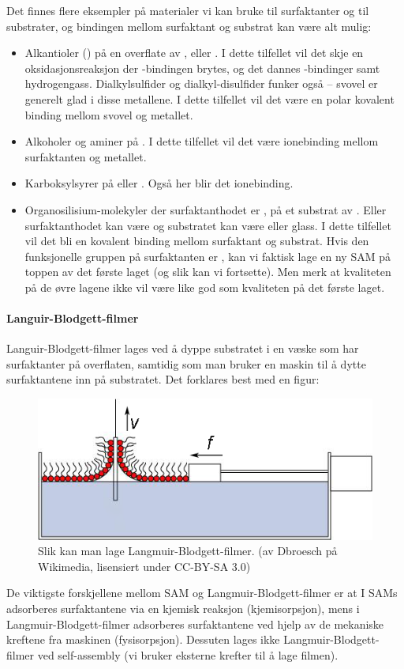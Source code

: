Det finnes flere eksempler på materialer vi kan bruke til surfaktanter og til substrater, og bindingen mellom surfaktant og substrat kan være alt mulig:
\begin{itemize}
	\item Alkantioler () på en overflate av ,  eller . I dette tilfellet vil det skje en oksidasjonsreaksjon der -bindingen brytes, og det dannes -bindinger samt hydrogengass. Dialkylsulfider og dialkyl-disulfider funker også -- svovel er generelt glad i disse metallene. I dette tilfellet vil det være en polar kovalent binding mellom svovel og metallet.
	\item Alkoholer og aminer på . I dette tilfellet vil det være ionebinding mellom surfaktanten og metallet.
	\item Karboksylsyrer på  eller . Også her blir det ionebinding.
	\item Organosilisium-molekyler der surfaktanthodet er , på et substrat av . Eller surfaktanthodet kan være  og substratet kan være  eller glass. I dette tilfellet vil det bli en kovalent binding mellom surfaktant og substrat. Hvis den funksjonelle gruppen på surfaktanten er , kan vi faktisk lage en ny SAM på toppen av det første laget (og slik kan vi fortsette). Men merk at kvaliteten på de øvre lagene ikke vil være like god som kvaliteten på det første laget.
\end{itemize}

\paragraph{Languir-Blodgett-filmer}
Languir-Blodgett-filmer lages ved å dyppe substratet i en væske som har surfaktanter på overflaten, samtidig som man bruker en maskin til å dytte surfaktantene inn på substratet. Det forklares best med en figur:
\begin{figure}[H]
	\bmd\centering
	\includegraphics[width=\linewidth]{metodefigs/lb.png}
	\caption{Slik kan man lage Langmuir-Blodgett-filmer.  (av Dbroesch på Wikimedia, lisensiert under CC-BY-SA 3.0)}
	\label{fig:label}
\emd\end{figure}
De viktigste forskjellene mellom SAM og Langmuir-Blodgett-filmer er at I SAMs adsorberes surfaktantene via en kjemisk reaksjon (kjemisorpsjon), mens i Langmuir-Blodgett-filmer adsorberes surfaktantene ved hjelp av de mekaniske kreftene fra maskinen (fysisorpsjon). Dessuten lages ikke Langmuir-Blodgett-filmer ved self-assembly (vi bruker eksterne krefter til å lage filmen).

